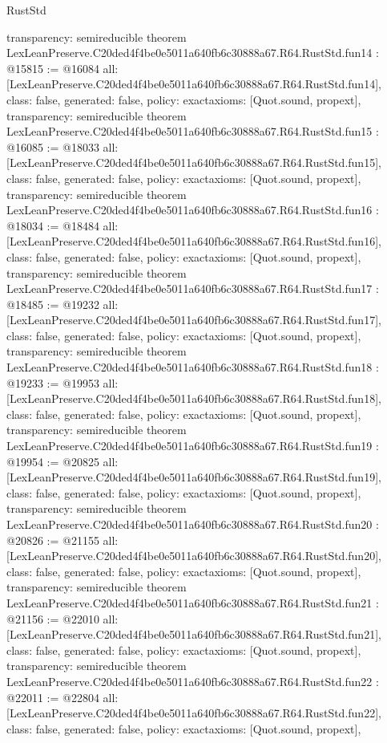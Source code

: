 \begin{lexlean}{RustStd}
\begin{coremodule}
{  transparency: semireducible
}
theorem LexLeanPreserve.C20ded4f4be0e5011a640fb6c30888a67.R64.RustStd.fun14 : @15815 := @16084 {
  all: [LexLeanPreserve.C20ded4f4be0e5011a640fb6c30888a67.R64.RustStd.fun14],
  class: false,
  generated: false,
  policy: exact{axioms: [Quot.sound, propext]},
  transparency: semireducible
}
theorem LexLeanPreserve.C20ded4f4be0e5011a640fb6c30888a67.R64.RustStd.fun15 : @16085 := @18033 {
  all: [LexLeanPreserve.C20ded4f4be0e5011a640fb6c30888a67.R64.RustStd.fun15],
  class: false,
  generated: false,
  policy: exact{axioms: [Quot.sound, propext]},
  transparency: semireducible
}
theorem LexLeanPreserve.C20ded4f4be0e5011a640fb6c30888a67.R64.RustStd.fun16 : @18034 := @18484 {
  all: [LexLeanPreserve.C20ded4f4be0e5011a640fb6c30888a67.R64.RustStd.fun16],
  class: false,
  generated: false,
  policy: exact{axioms: [Quot.sound, propext]},
  transparency: semireducible
}
theorem LexLeanPreserve.C20ded4f4be0e5011a640fb6c30888a67.R64.RustStd.fun17 : @18485 := @19232 {
  all: [LexLeanPreserve.C20ded4f4be0e5011a640fb6c30888a67.R64.RustStd.fun17],
  class: false,
  generated: false,
  policy: exact{axioms: [Quot.sound, propext]},
  transparency: semireducible
}
theorem LexLeanPreserve.C20ded4f4be0e5011a640fb6c30888a67.R64.RustStd.fun18 : @19233 := @19953 {
  all: [LexLeanPreserve.C20ded4f4be0e5011a640fb6c30888a67.R64.RustStd.fun18],
  class: false,
  generated: false,
  policy: exact{axioms: [Quot.sound, propext]},
  transparency: semireducible
}
theorem LexLeanPreserve.C20ded4f4be0e5011a640fb6c30888a67.R64.RustStd.fun19 : @19954 := @20825 {
  all: [LexLeanPreserve.C20ded4f4be0e5011a640fb6c30888a67.R64.RustStd.fun19],
  class: false,
  generated: false,
  policy: exact{axioms: [Quot.sound, propext]},
  transparency: semireducible
}
theorem LexLeanPreserve.C20ded4f4be0e5011a640fb6c30888a67.R64.RustStd.fun20 : @20826 := @21155 {
  all: [LexLeanPreserve.C20ded4f4be0e5011a640fb6c30888a67.R64.RustStd.fun20],
  class: false,
  generated: false,
  policy: exact{axioms: [Quot.sound, propext]},
  transparency: semireducible
}
theorem LexLeanPreserve.C20ded4f4be0e5011a640fb6c30888a67.R64.RustStd.fun21 : @21156 := @22010 {
  all: [LexLeanPreserve.C20ded4f4be0e5011a640fb6c30888a67.R64.RustStd.fun21],
  class: false,
  generated: false,
  policy: exact{axioms: [Quot.sound, propext]},
  transparency: semireducible
}
theorem LexLeanPreserve.C20ded4f4be0e5011a640fb6c30888a67.R64.RustStd.fun22 : @22011 := @22804 {
  all: [LexLeanPreserve.C20ded4f4be0e5011a640fb6c30888a67.R64.RustStd.fun22],
  class: false,
  generated: false,
  policy: exact{axioms: [Quot.sound, propext]},
}
\end{coremodule}
\end{lexlean}
